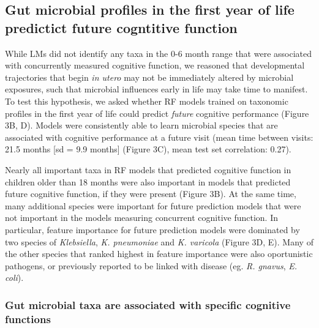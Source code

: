 \documentclass{article}
\begin{document}
\subsection*{Gut microbial profiles in the first year of life predictict future cogntitive function}

While LMs did not identify any taxa in the 0-6 month range
that were associated with concurrently measured cognitive function,
we reasoned that developmental trajectories that begin
\textit{in utero} may not be immediately altered by
microbial exposures, such that microbial influences early in life
may take time to manifest. To test this hypothesis,
we asked whether RF models trained on taxonomic profiles
in the first year of life
could predict \textit{future} cognitive performance (Figure 3B, D).
Models were consistently able to learn microbial species that are associated
with cognitive performance at a future visit
(mean time between visits: 21.5 months [sd = 9.9 months] (Figure 3C),
mean test set correlation: 0.27).

Nearly all important taxa in RF models that predicted cognitive function
in children older than 18 months were also important in
models that predicted future cognitive function, if they were present (Figure 3B).
At the same time, many additional species were important for future prediction models
that were not important in the models measuring concurrent cognitive function.
In particular, feature importance for future prediction models
were dominated by two species of \textit{Klebsiella},
\textit{K. pneumoniae} and \textit{K. varicola} (Figure 3D, E).
Many of the other species that ranked highest in feature importance
were also oportunistic pathogens, or previously reported
to be linked with disease (eg. \textit{R. gnavus}, \textit{E. coli}).

\subsubsection*{Gut microbial taxa are associated with specific cognitive functions} %
\end{document}
